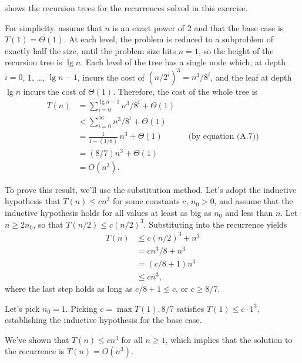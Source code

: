  shows the recursion trees for the recurrences solved in this exercise.
\vspace*{2\baselineskip}

\subexercise
For simplicity, assume that $n$ is an exact power of 2 and that the base case is $T(1)=\Theta(1)$.
At each level, the problem is reduced to a subproblem of exactly half the size, until the problem size hits $n=1$, so the height of the recursion tree is $\lg n$.
Each level of the tree has a single node which, at depth $i=0$, 1, \dots, $\lg n-1$, incurs the cost of $(n/2^i)^3=n^3\!/8^i$, and the leaf at depth $\lg n$ incurs the cost of $\Theta(1)$.
Therefore, the cost of the whole tree is
\begin{align*}
    T(n) &= \sum_{i=0}^{\lg n-1}n^3\!/8^i+\Theta(1) \\
    &< \sum_{i=0}^\infty n^3\!/8^i+\Theta(1) \\
    &= \frac{1}{1-(1/8)}\,n^3+\Theta(1) && \text{(by equation (A.7))} \\[1mm]
    &= (8/7)n^3+\Theta(1) \\
    &= O(n^3).
\end{align*}

To prove this result, we'll use the substitution method.
Let's adopt the inductive hypothesis that $T(n)\le cn^3$ for some constants $c$, $n_0>0$, and assume that the inductive hypothesis holds for all values at least as big as $n_0$ and less than $n$.
Let $n\ge2n_0$, so that $T(n/2)\le c(n/2)^3$.
Substituting into the recurrence yields
\begin{align*}
    T(n) &\le c(n/2)^3+n^3 \\
    &= cn^3\!/8+n^3 \\
    &= (c/8+1)n^3 \\
    &\le cn^3,
\end{align*}
where the last step holds as long as $c/8+1\le c$, or $c\ge8/7$.

Let's pick $n_0=1$.
Picking $c=\max{T(1),8/7}$ satisfies $T(1)\le c\cdot1^3$, establishing the inductive hypothesis for the base case.

We've shown that $T(n)\le cn^3$ for all $n\ge1$, which implies that the solution to the recurrence is $T(n)=O(n^3)$.

